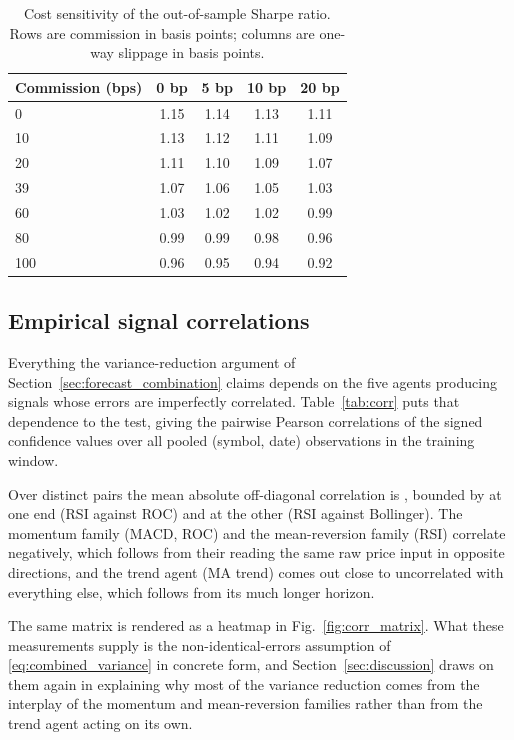 \begin{table}[!htbp]
\centering
\caption{Cost sensitivity of the out-of-sample Sharpe ratio. Rows are commission in basis points; columns are one-way slippage in basis points.}
\label{tab:cost_sensitivity}
\begin{tabular}{lcccc}
\toprule
\textbf{Commission (bps)} & \textbf{0 bp} & \textbf{5 bp} & \textbf{10 bp} & \textbf{20 bp} \\
\midrule
0 & 1.15 & 1.14 & 1.13 & 1.11 \\
10 & 1.13 & 1.12 & 1.11 & 1.09 \\
20 & 1.11 & 1.10 & 1.09 & 1.07 \\
39 & 1.07 & 1.06 & 1.05 & 1.03 \\
60 & 1.03 & 1.02 & 1.02 & 0.99 \\
80 & 0.99 & 0.99 & 0.98 & 0.96 \\
100 & 0.96 & 0.95 & 0.94 & 0.92 \\
\bottomrule
\end{tabular}
\end{table}

\subsection{Empirical signal correlations}\label{subsec:correlations}

Everything the variance-reduction argument of Section~\ref{sec:forecast_combination} claims depends on the five agents producing signals whose errors are imperfectly correlated. Table~\ref{tab:corr} puts that dependence to the test, giving the pairwise Pearson correlations \cite{pearson1896} of the signed confidence values over all pooled (symbol, date) observations in the training window.

Over \CorrN{} distinct pairs the mean absolute off-diagonal correlation is \CorrMeanAbs{}, bounded by \CorrMin{} at one end (RSI against ROC) and \CorrMax{} at the other (RSI against Bollinger). The momentum family (MACD, ROC) and the mean-reversion family (RSI) correlate negatively, which follows from their reading the same raw price input in opposite directions, and the trend agent (MA trend) comes out close to uncorrelated with everything else, which follows from its much longer horizon.

The same matrix is rendered as a heatmap in Fig.~\ref{fig:corr_matrix}. What these measurements supply is the non-identical-errors assumption of \eqref{eq:combined_variance} in concrete form, and Section~\ref{sec:discussion} draws on them again in explaining why most of the variance reduction comes from the interplay of the momentum and mean-reversion families rather than from the trend agent acting on its own.

